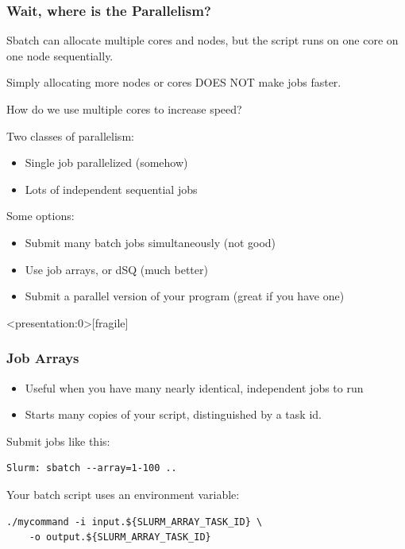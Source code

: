 \documentclass[10pt]{beamer}
\begin{document}
\begin{frame}[fragile]
\frametitle{Wait, where is the Parallelism?}

Sbatch can allocate multiple cores and nodes, but the script runs on one core on one node sequentially.  

Simply allocating more nodes or cores DOES NOT make jobs faster.

How do we use multiple cores to increase speed?

Two classes of parallelism:
\begin{itemize}
\item Single job parallelized (somehow)
\item Lots of independent sequential jobs
\end{itemize}

Some options:
\begin{itemize}
\item Submit many batch jobs simultaneously (not good)
\item Use job arrays, or dSQ (much better)
\item Submit a parallel version of your program (great if you have one)
\end{itemize}

\end{frame}

\begin{frame}<presentation:0>[fragile]
\frametitle{Job Arrays}

\begin{itemize}
\item Useful when you have many nearly identical, independent jobs to run
\item Starts many copies of your script, distinguished by a task id.
\end{itemize}

Submit jobs like this:
\begin{verbatim}
Slurm: sbatch --array=1-100 ..
\end{verbatim}

Your batch script uses an environment variable:
\begin{verbatim}
./mycommand -i input.${SLURM_ARRAY_TASK_ID} \
    -o output.${SLURM_ARRAY_TASK_ID}
\end{verbatim}
\end{frame}
\end{document}
